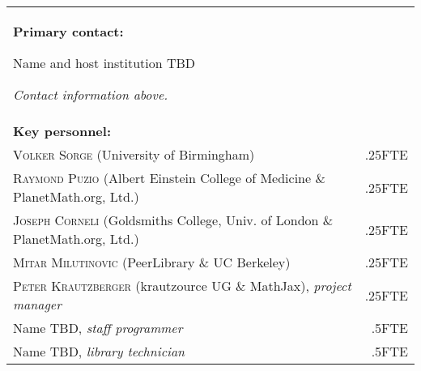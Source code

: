 \documentclass[10pt]{article}
\begin{document}
\bigskip

\begin{tabular}{p{}r}
\textbf{Primary contact:} \par
Name and host institution TBD
\par \emph{Contact information above.} &  \\[1cm]
\textbf{Key personnel:} &\\
\textsc{Volker Sorge} (University of Birmingham) &.25FTE \\
\textsc{Raymond Puzio} (Albert Einstein College of Medicine \& PlanetMath.org, Ltd.) & .25FTE \\
\textsc{Joseph Corneli} (Goldsmiths College, Univ. of London \& PlanetMath.org, Ltd.) &.25FTE \\
\textsc{Mitar Milutinovic} (PeerLibrary \& UC Berkeley)  &.25FTE \\
\textsc{Peter Krautzberger} (krautzource UG \& MathJax), \emph{project manager}&.25FTE\\
Name TBD, \emph{staff programmer}   &.5FTE \\
Name TBD, \emph{library technician}  &.5FTE \\
\end{tabular}
\end{document}
